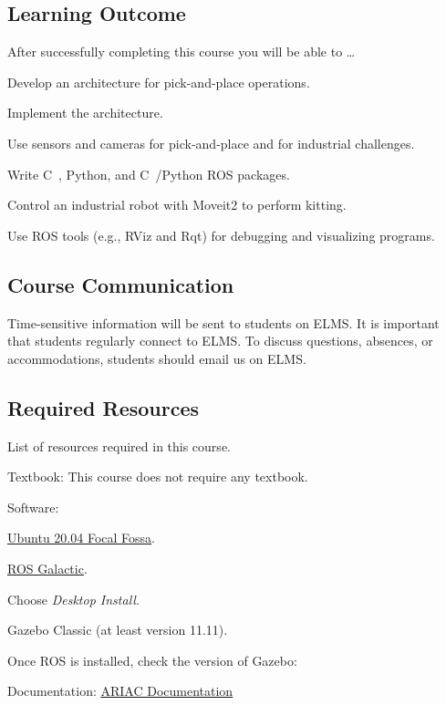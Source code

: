 \documentclass[11pt,usenames,dvipsnames,svgnames,x11names,letterpaper]{article}
\newcommand{\urllink}[2]{\href{#1}{\textcolor{Tomato3}{{{\tiny\faChevronRight}\uline{#2}}}}}
\def\CC{{C\nolinebreak[4]\hspace{-.05em}\raisebox{.4ex}{\tiny\bf ++}}~}
\begin{document}
\subsection{Learning Outcome}
After successfully completing this course you will be able to \dots
\begin{compactitem}
    \item Develop an architecture for pick-and-place operations.
    \item Implement the architecture.
    \item Use sensors and cameras for pick-and-place and for industrial challenges.
    \item Write \CC, Python, and \CC/Python ROS packages.
    \item Control an industrial robot with Moveit2 to perform kitting.
    \item Use ROS tools (e.g., RViz and Rqt) for debugging and visualizing programs.
\end{compactitem} \vspace{0.3cm}

\subsection{Course Communication}
Time-sensitive information will be sent to students on ELMS. It is important that students regularly connect to ELMS. To discuss questions, absences, or accommodations, students should email us on ELMS.
\vspace{0.3cm}

\subsection{Required Resources}
List of resources required in this course.
\begin{compactitem}
    \item Textbook: This course does not require any textbook.
    \item Software:
    \begin{compactitem}
    \item \urllink{https://phoenixnap.com/kb/install-ubuntu-20-04}{Ubuntu 20.04 Focal Fossa}.
    \item \urllink{https://docs.ros.org/en/galactic/Installation/Ubuntu-Install-Debians.html}{ROS Galactic}.
    \begin{compactitem}
        \item Choose \textit{Desktop Install}.
    \end{compactitem}
    \item Gazebo Classic (at least version 11.11).
    \begin{compactitem}
        \item Once ROS is installed, check the version of Gazebo: 
    \end{compactitem}
\end{compactitem}
    \item Documentation: \urllink{https://ariac.readthedocs.io/en/latest/index.html}{ARIAC Documentation}
\end{compactitem}\vspace{0.3cm}
\end{document}
